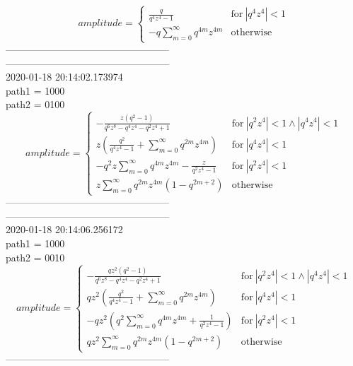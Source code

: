 $$amplitude = \begin{cases} \frac{q}{q^{4} z^{4} - 1} & \text{for}\: \left|{q^{4} z^{4}}\right| < 1 \\- q \sum_{m=0}^{\infty} q^{4 m} z^{4 m} & \text{otherwise} \end{cases}$$
--------------------------------------------------\\
--------------------------------------------------\\
2020-01-18 20:14:02.173974\\
path1 = 1000\\
path2 = 0100\\
$$amplitude = \begin{cases} - \frac{z \left(q^{2} - 1\right)}{q^{6} z^{8} - q^{4} z^{4} - q^{2} z^{4} + 1} & \text{for}\: \left|{q^{2} z^{4}}\right| < 1 \wedge \left|{q^{4} z^{4}}\right| < 1 \\z \left(\frac{q^{2}}{q^{4} z^{4} - 1} + \sum_{m=0}^{\infty} q^{2 m} z^{4 m}\right) & \text{for}\: \left|{q^{4} z^{4}}\right| < 1 \\- q^{2} z \sum_{m=0}^{\infty} q^{4 m} z^{4 m} - \frac{z}{q^{2} z^{4} - 1} & \text{for}\: \left|{q^{2} z^{4}}\right| < 1 \\z \sum_{m=0}^{\infty} q^{2 m} z^{4 m} \left(1 - q^{2 m + 2}\right) & \text{otherwise} \end{cases}$$
--------------------------------------------------\\
--------------------------------------------------\\
2020-01-18 20:14:06.256172\\
path1 = 1000\\
path2 = 0010\\
$$amplitude = \begin{cases} - \frac{q z^{2} \left(q^{2} - 1\right)}{q^{6} z^{8} - q^{4} z^{4} - q^{2} z^{4} + 1} & \text{for}\: \left|{q^{2} z^{4}}\right| < 1 \wedge \left|{q^{4} z^{4}}\right| < 1 \\q z^{2} \left(\frac{q^{2}}{q^{4} z^{4} - 1} + \sum_{m=0}^{\infty} q^{2 m} z^{4 m}\right) & \text{for}\: \left|{q^{4} z^{4}}\right| < 1 \\- q z^{2} \left(q^{2} \sum_{m=0}^{\infty} q^{4 m} z^{4 m} + \frac{1}{q^{2} z^{4} - 1}\right) & \text{for}\: \left|{q^{2} z^{4}}\right| < 1 \\q z^{2} \sum_{m=0}^{\infty} q^{2 m} z^{4 m} \left(1 - q^{2 m + 2}\right) & \text{otherwise} \end{cases}$$
--------------------------------------------------\\
